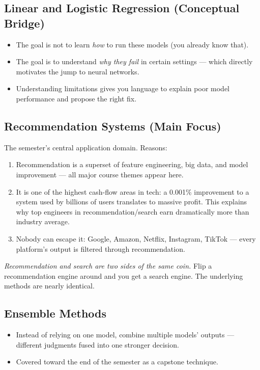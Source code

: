 \documentclass[11pt]{article}
\begin{document}
\subsection{Linear and Logistic Regression (Conceptual Bridge)}
\begin{itemize}
    \item The goal is not to learn \emph{how} to run these models (you already know that).
    \item The goal is to understand \emph{why they fail} in certain settings --- which directly motivates the jump to neural networks.
    \item Understanding limitations gives you language to explain poor model performance and propose the right fix.
\end{itemize}

\newpage
\subsection{Recommendation Systems (Main Focus)}
The semester's central application domain. Reasons:
\begin{enumerate}
    \item Recommendation is a superset of feature engineering, big data, and model improvement --- all major course themes appear here.
    \item It is one of the highest cash-flow areas in tech: a 0.001\% improvement to a system used by billions of users translates to massive profit. This explains why top engineers in recommendation/search earn dramatically more than industry average.
    \item Nobody can escape it: Google, Amazon, Netflix, Instagram, TikTok --- every platform's output is filtered through recommendation.
\end{enumerate}

\textit{Recommendation and search are two sides of the same coin.} Flip a recommendation engine around and you get a search engine. The underlying methods are nearly identical.

\subsection{Ensemble Methods}
\begin{itemize}
    \item Instead of relying on one model, combine multiple models' outputs --- different judgments fused into one stronger decision.
    \item Covered toward the end of the semester as a capstone technique.
\end{itemize}
\end{document}
